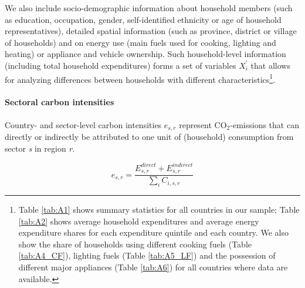 \documentclass[12pt, a4paper]{article}
\begin{document}
We also include socio-demographic information about household members (such as education, occupation, gender, self-identified ethnicity or age of household representatives), detailed spatial information (such as province, district or village of households) and on energy use (main fuels used for cooking, lighting and heating) or appliance and vehicle ownership. Such household-level information (including total household expenditures) forms a set of variables $X_{i}^{'}$ that allows for analyzing differences between households with different characteristics\footnote{Table \ref{tab:A1} shows summary statistics for all countries in our sample; Table \ref{tab:A2} shows average household expenditures and average energy expenditure shares for each expenditure quintile and each country. We also show the share of households using different cooking fuels (Table \ref{tab:A4_CF}), lighting fuels (Table \ref{tab:A5_LF}) and the possession of different major appliances (Table \ref{tab:A6}) for all countries where data are available.}.


\paragraph{Sectoral carbon intensities} Country- and sector-level carbon intensities $e_{s,r}$ represent CO$_{2}$-emissions that can directly or indirectly be attributed to one unit of (household) consumption from sector \textit{s} in region \textit{r}.

\begin{equation}
    e_{s,r} = \frac{E_{s,r}^{direct}+E_{s,r}^{indirect}}{\sum_{i} C_{i,s,r}}
\end{equation}
\end{document}
